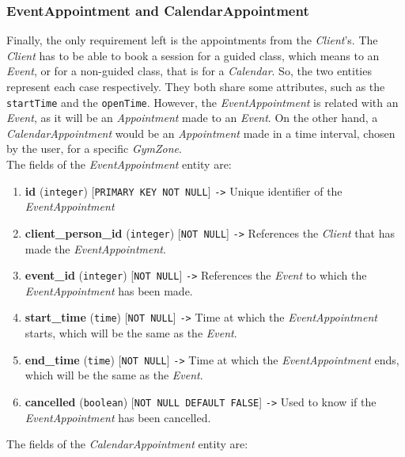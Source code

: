 \documentclass[a4paper, 12pt, oneside]{book}
\begin{document}
\subsubsection{EventAppointment and CalendarAppointment}
Finally, the only requirement left is the appointments from the \emph{Client}'s. The \emph{Client} has to be able to book a session for a guided class, which means to an \emph{Event}, or for a non-guided class, that is for a \emph{Calendar}. So, the two entities represent each case respectively. They both share some attributes, such as the \texttt{startTime} and the \texttt{openTime}. However, the \emph{EventAppointment} is related with an \emph{Event}, as it will be an \emph{Appointment} made to an \emph{Event}. On the other hand, a \emph{CalendarAppointment} would be an \emph{Appointment} made in a time interval, chosen by the user, for a specific \emph{GymZone}.
\\[8pt]
The fields of the \emph{EventAppointment} entity are:
\begin{enumerate}[label = -]
	\item \textbf{id} (\texttt{integer}) [\texttt{PRIMARY KEY NOT NULL}] \texttt{->} Unique identifier of the \emph{EventAppointment}
	\item \textbf{client\_person\_id} (\texttt{integer}) [\texttt{NOT NULL}] \texttt{->} References the \emph{Client} that has made the \emph{EventAppointment}.
	\item \textbf{event\_id} (\texttt{integer}) [\texttt{NOT NULL}] \texttt{->} References the \emph{Event} to which the \emph{EventAppointment} has been made.
	\item \textbf{start\_time} (\texttt{time}) [\texttt{NOT NULL}] \texttt{->} Time at which the \emph{EventAppointment} starts, which will be the same as the \emph{Event}.
	\item \textbf{end\_time} (\texttt{time}) [\texttt{NOT NULL}] \texttt{->} Time at which the \emph{EventAppointment} ends, which will be the same as the \emph{Event}.
	\item \textbf{cancelled} (\texttt{boolean}) [\texttt{NOT NULL DEFAULT FALSE}] \texttt{->} Used to know if the \emph{EventAppointment} has been cancelled.
\end{enumerate}
The fields of the \emph{CalendarAppointment} entity are:
\end{document}
